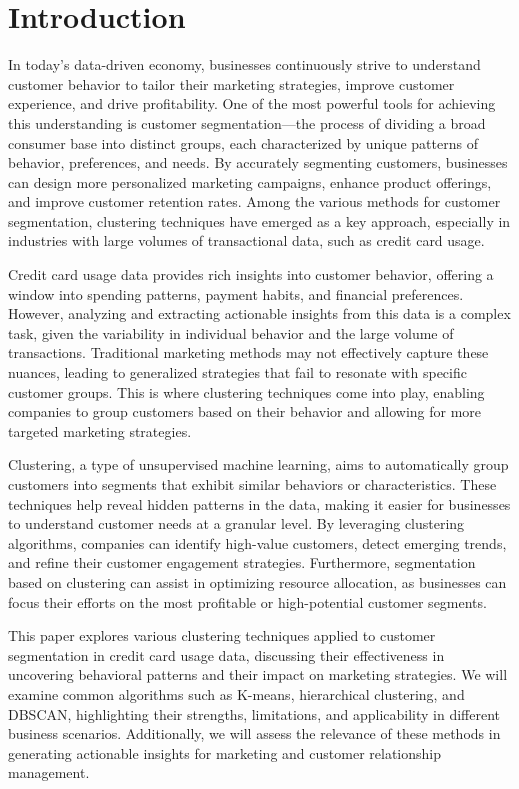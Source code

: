 \documentclass[runningheads,a4paper]{llncs}
\begin{document}
\section{Introduction}

In today's data-driven economy, businesses continuously strive to understand customer behavior to tailor their marketing strategies, improve customer experience, and drive profitability. One of the most powerful tools for achieving this understanding is customer segmentation—the process of dividing a broad consumer base into distinct groups, each characterized by unique patterns of behavior, preferences, and needs. By accurately segmenting customers, businesses can design more personalized marketing campaigns, enhance product offerings, and improve customer retention rates. Among the various methods for customer segmentation, clustering techniques have emerged as a key approach, especially in industries with large volumes of transactional data, such as credit card usage.

Credit card usage data provides rich insights into customer behavior, offering a window into spending patterns, payment habits, and financial preferences. However, analyzing and extracting actionable insights from this data is a complex task, given the variability in individual behavior and the large volume of transactions. Traditional marketing methods may not effectively capture these nuances, leading to generalized strategies that fail to resonate with specific customer groups. This is where clustering techniques come into play, enabling companies to group customers based on their behavior and allowing for more targeted marketing strategies.

Clustering, a type of unsupervised machine learning, aims to automatically group customers into segments that exhibit similar behaviors or characteristics. These techniques help reveal hidden patterns in the data, making it easier for businesses to understand customer needs at a granular level. By leveraging clustering algorithms, companies can identify high-value customers, detect emerging trends, and refine their customer engagement strategies. Furthermore, segmentation based on clustering can assist in optimizing resource allocation, as businesses can focus their efforts on the most profitable or high-potential customer segments.

This paper explores various clustering techniques applied to customer segmentation in credit card usage data, discussing their effectiveness in uncovering behavioral patterns and their impact on marketing strategies. We will examine common algorithms such as K-means, hierarchical clustering, and DBSCAN, highlighting their strengths, limitations, and applicability in different business scenarios. Additionally, we will assess the relevance of these methods in generating actionable insights for marketing and customer relationship management.
\end{document}
